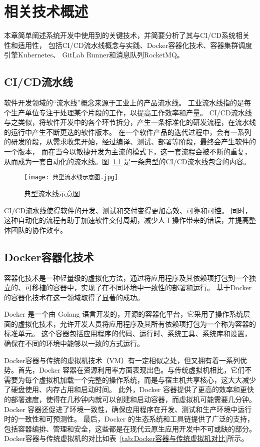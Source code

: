 
\chapter{相关技术概述}
本章简单阐述系统开发中使用到的关键技术，并简要分析了其与CI/CD系统相关性和适用性，
包括CI/CD流水线概念与实践、Docker容器化技术、容器集群调度引擎Kubernetes、 GitLab Runner和消息队列RocketMQ。

\section{CI/CD流水线}
软件开发领域的“流水线”概念来源于工业上的产品流水线。
工业流水线指的是每个生产单位专注于处理某个片段的工作，以提高工作效率和产量。
CI/CD流水线与之类似，将软件开发中的各个环节拆分，产生一条标准化的研发流程，在流水线的运行中产生不断更迭的软件版本。
在一个软件产品的迭代过程中，会有一系列的研发阶段，从需求收集开始，经过编译、测试、部署等阶段，最终会产生软件的一个版本，
而在当今以敏捷开发为主流的模式下，这一套流程会被不断的重复，从而成为一套自动化的流水线。图~\ref{fig:典型流水线示意图} 是一条典型的CI/CD流水线包含的内容。

\begin{figure}[h]
    \centering
    \texttt{[image: 典型流水线示意图.jpg]}
    \caption{典型流水线示意图}
    \label{fig:典型流水线示意图}
  \end{figure}

CI/CD流水线使得软件的开发、测试和交付变得更加高效、可靠和可控\cite{mohammad2016continuous}。
同时，这种自动化的流程有助于加速软件交付周期，减少人工操作带来的错误，并提高整体团队的协作效率。

\section{Docker容器化技术}
容器化技术是一种轻量级的虚拟化方法，通过将应用程序及其依赖项打包到一个独立的、可移植的容器中，实现了在不同环境中一致性的部署和运行。
基于Docker的容器化技术在这一领域取得了显著的成功。

Docker 是一个由 Golang 语言开发的，开源的容器化平台，它采用了操作系统层面的虚拟化技术，允许开发人员将应用程序及其所有依赖项打包为一个称为容器的标准单元\cite{第二章Docker}。
这个容器包括应用程序的代码、运行时、系统工具、系统库和设置，确保在不同的环境中能够以一致的方式运行。

Docker容器与传统的虚拟机技术（VM）有一定相似之处，但又拥有着一系列优势。首先，Docker 容器在资源利用率方面表现出色\cite{张忠琳2014基于}。与传统虚拟机相比，它们不需要为每个虚拟机加载一个完整的操作系统，而是与宿主机共享核心，这大大减少了硬盘使用、内存占用和启动时间。
此外，Docker 容器提供了更高的效率和更快的部署速度，使得在几秒钟内就可以创建和启动容器，而虚拟机可能需要几分钟\cite{JSJY201704001}。
Docker 容器还促进了环境一致性，确保应用程序在开发、测试和生产环境中运行时的一致性和可预测性。
最后，Docker 的生态系统和工具链提供了广泛的支持\cite{DGJB201806026}，包括容器编排、管理和安全，这些都是在现代云原生应用开发中不可或缺的部分。
Docker容器与传统虚拟机的对比如表~\ref{tab:Docker容器与传统虚拟机对比}所示。

